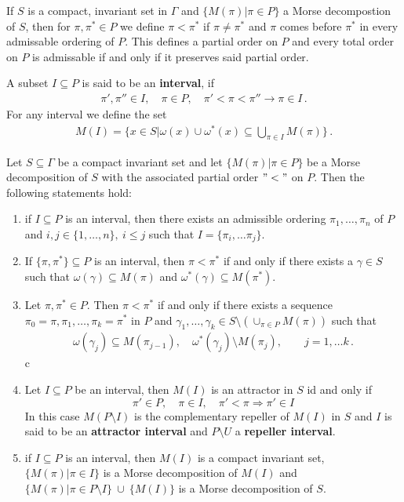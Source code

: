 \begin{cor}
	If $S$ is a compact, invariant set in $\Gamma$ and $\{M(\pi)|\pi\in P\}$ a Morse decompostion of $S$, then for $\pi,\pi^*\in P$ we define $\pi <\pi^*$ if $\pi \neq \pi^*$ and $\pi$ comes before $\pi^*$ in every admissable ordering of $P$. This defines a partial order on $P$ and every total order on $P$ is admissable if and only if it preserves said partial order.
\end{cor}
\begin{definition}
	A subset $I\subseteq P$ is said to be an \textbf{interval}, if
	\begin{align*}
		\pi',\pi''\in I,\quad \pi \in P,\quad \pi'<\pi<\pi''  \rightarrow \pi\in I \, .
	\end{align*} For any interval we define the set
	\begin{align*}
		M(I)=\{ x \in S | \omega (x)\cup \omega^*(x)\subseteq \bigcup\limits_{\pi \in I}M(\pi)\}\, .
	\end{align*}
\end{definition}
\begin{prop}
	Let $S\subseteq \Gamma$ be a  compact invariant set and let $\{M(\pi)|\pi\in P\}$ be a Morse decomposition of $S$ with the associated partial order $"<"$ on $P$. Then the following statements hold:
	\begin{enumerate}
		\item if $I\subseteq P$ is an interval, then there exists an admissible ordering $\pi_1,\dots ,\pi_n$ of $P$ and $i,j\in \{1,\dots,n\},~i\leq j$ such that $I=\{ \pi_i,\dots \pi_j\}$.
		\item If $\{\pi,\pi^*\}\subseteq P$ is an interval, then $\pi<\pi^*$ if and only if there exists a $\gamma \in S$ such that $\omega(\gamma) \subseteq M(\pi)$ and $\omega^*(\gamma)\subseteq M(\pi^*)$.
		\item Let $\pi , \pi^*\in P$. Then $\pi < \pi^*$ if and only if there exists a sequence $\pi_0=\pi,\pi_1,\dots ,\pi_k=\pi^*$ in $P$ and $\gamma_1,\dots ,\gamma_k\in S\setminus (\cup_{\pi \in P} M(\pi))$ such that
		\begin{align*}
			\omega(\gamma_j)\subseteq M(\pi_{j-1}),\quad \omega^*(\gamma_j)\setminus M(\pi_j),\quad \quad j=1,\dots k\, .
		\end{align*}c
		\item Let $I\subseteq P$ be an interval, then $M(I)$ is an attractor in $S$ id and only if
		\begin{equation*}
			\pi'\in P,\quad \pi\in I,\quad \pi'< \pi \Rightarrow \pi'\in I
		\end{equation*} In this case $M(P\setminus I)$ is the complementary repeller of $M(I)$ in $S$ and $I$ is said to be an \textbf{attractor interval} and $P\setminus U$ a \textbf{repeller interval}.
		\item if $I\subseteq P$ is an interval, then $M(I)$ is a compact invariant set, $\{M(\pi)|\pi\in I\}$ is a Morse decomposition of $M(I)$ and $\{M(\pi)|\pi\in P\setminus I\}~\cup ~ \{M(I)\}$ is a Morse decomposition of $S$.
	\end{enumerate}
\end{prop}
